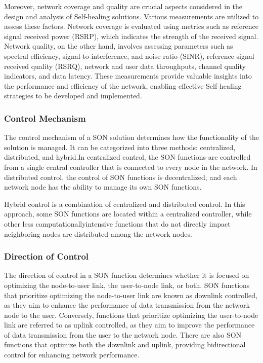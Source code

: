 Moreover, network coverage and quality are crucial aspects considered in the design and analysis of Self-healing solutions. Various measurements are utilized to assess these factors. Network coverage is evaluated using metrics such as reference signal received power (RSRP), which indicates the strength of the received signal. Network quality, on the other hand, involves assessing parameters such as spectral efficiency, signal-to-interference, and noise ratio (SINR), reference signal received quality (RSRQ), network and user data throughputs, channel quality indicators, and data latency. These measurements provide valuable insights into the performance and efficiency of the network, enabling effective Self-healing strategies to be developed and implemented.

\subsubsection{ Control Mechanism}

The control mechanism of a SON solution determines how the functionality of the solution is managed. It can be categorized into three methods: centralized, distributed, and hybrid.In centralized control, the SON functions are controlled from a single central controller that is connected to every node in the network.
In distributed control, the control of SON functions is decentralized, and each network node has the ability to manage its own SON functions.

Hybrid control is a combination of centralized and distributed control. In this approach, some SON functions are located within a centralized controller, while other less computationallyintensive functions that do not directly impact neighboring nodes are distributed among the network nodes.

\subsubsection{Direction of Control}

The direction of control in a SON function determines whether it is focused on optimizing the node-to-user link, the user-to-node link, or both. SON functions that prioritize optimizing the node-to-user link are known as downlink controlled, as they aim to enhance the performance of data transmission from the network node to the user. Conversely, functions that prioritize optimizing the user-to-node link are referred to as uplink controlled, as they aim to improve the performance of data transmission from the user to the network node. There are also SON functions that optimize both the downlink and uplink, providing bidirectional control for enhancing network performance.

